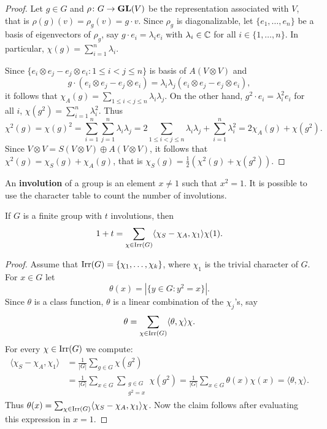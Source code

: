 \begin{proof}
    Let $g\in G$ and $\rho\colon G\to\mathbf{GL}(V)$ be the representation
    associated with $V$, that is $\rho(g)(v)=\rho_g(v)=g\cdot v$. 
    Since $\rho_g$ is diagonalizable, let $\{e_1,\dots,e_n\}$ 
    be a basis of eigenvectors of $\rho_g$, say
    $g\cdot e_i=\lambda_ie_i$ with $\lambda_i\in\mathbb{C}$ for all $i\in\{1,\dots,n\}$. In particular, $\chi(g)=\sum_{i=1}^n\lambda_i$. 
    
    Since $\{e_i\otimes e_j-e_j\otimes e_i:1\leq i<j\leq n\}$ is basis of
    $A(V\otimes V)$ and 
    \[
    g\cdot (e_i\otimes e_j-e_j\otimes e_i)=\lambda_i\lambda_j(e_i\otimes e_j-e_j\otimes e_i),
    \]
    it follows that
    $\chi_A(g)=\sum_{1\leq i<j\leq n}\lambda_i\lambda_j$. On the other hand,
    $g^2\cdot e_i=\lambda_i^2e_i$ for all $i$,
    $\chi(g^2)=\sum_{i=1}^n\lambda_i^2$. Thus 
    \[
    \chi^2(g)=\chi(g)^2=\sum_{i=1}^n\sum_{j=1}^n\lambda_i\lambda_j=2\sum_{1\leq i<j\leq n}\lambda_i\lambda_j+\sum_{i=1}^n\lambda_i^2=2\chi_A(g)+\chi(g^2).
    \]
    Since $V\otimes V=S(V\otimes V)\oplus A(V\otimes V)$, it follows that  
    $\chi^2(g)=\chi_S(g)+\chi_A(g)$, that is 
    $\chi_S(g)=\frac12(\chi^2(g)+\chi(g^2))$.
\end{proof}

An \textbf{involution} of a group is an element $x\ne 1$ such that $x^2=1$. 
It is possible to use the character table to count the number
of involutions.

\begin{proposition}
    If $G$ is a finite group with $t$ involutions, then
    \[
        1+t=\sum_{\chi\in\operatorname{Irr}(G)}\langle\chi_S-\chi_A,\chi_1\rangle\chi(1).
    \]
\end{proposition}

\begin{proof}
    Assume that $\operatorname{Irr}(G)=\{\chi_1,\dots,\chi_k\}$, where $\chi_1$ is 
    the trivial character of $G$. 
    For $x\in G$ let 
    \[
    \theta(x)=|\{y\in G:y^2=x\}|.
    \]
    Since $\theta$ is a class function, 
    $\theta$ is a linear combination of the $\chi_j$'s, say 
    \[
    \theta=\sum_{\chi\in\operatorname{Irr}(G)}\langle\theta,\chi\rangle\chi.
    \]
    For every $\chi\in\operatorname{Irr}(G)$ we compute: 
    \begin{align*}
        \langle\chi_S-\chi_A,\chi_1\rangle 
        &=\frac{1}{|G|}\sum_{g\in G}\chi(g^2)\\
        &=\frac{1}{|G|}\sum_{x\in G}\sum_{\substack{g\in G\\g^2=x}}\chi(g^2)
        =\frac{1}{|G|}\sum_{x\in G}\theta(x)\chi(x)=\langle\theta,\chi\rangle.
    \end{align*}
    Thus $\theta(x)=\sum_{\chi\in\operatorname{Irr}(G)}\langle\chi_S-\chi_A,\chi_1\rangle\chi$. Now
    the claim follows after evaluating this expression in 
    $x=1$. 
\end{proof}

